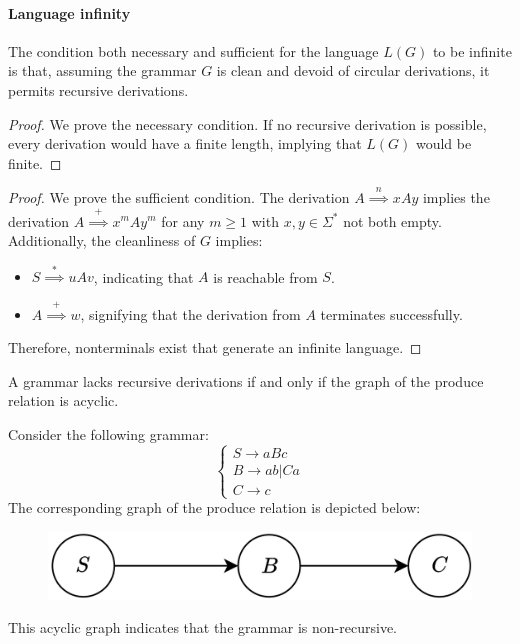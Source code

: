 \paragraph*{Language infinity}
The condition both necessary and sufficient for the language $L(G)$ to be infinite is that, assuming the grammar $G$ is clean and devoid of circular derivations, it permits recursive derivations.
\begin{proof}
    We prove the necessary condition.
    If no recursive derivation is possible, every derivation would have a finite length, implying that $L(G)$ would be finite.
\end{proof}
\begin{proof}
    We prove the sufficient condition.
    The derivation $A\overset{n}{\implies}xAy$ implies the derivation $A\overset{+}{\implies}x^mAy^m$ for any $m \geq 1$ with $x,y \in \Sigma^{*}$ not both empty. 
    Additionally, the cleanliness of $G$ implies:
    \begin{itemize}
        \item $S\overset{*}{\implies}uAv$, indicating that $A$ is reachable from $S$. 
        \item $A\overset{+}{\implies}w$, signifying that the derivation from $A$ terminates successfully. 
    \end{itemize}
    Therefore, nonterminals exist that generate an infinite language.
\end{proof}
\begin{property}
    A grammar lacks recursive derivations if and only if the graph of the produce relation is acyclic.
\end{property}
\begin{example}
    Consider the following grammar:
    \[\begin{cases}
        S \rightarrow aBc \\
        B \rightarrow ab | Ca \\
        C \rightarrow c
    \end{cases}\]
    The corresponding graph of the produce relation is depicted below:
    \begin{figure}[H]
        \centering
        \includegraphics[width=0.5\linewidth]{images/produce.png}
    \end{figure}
    This acyclic graph indicates that the grammar is non-recursive.
\end{example}